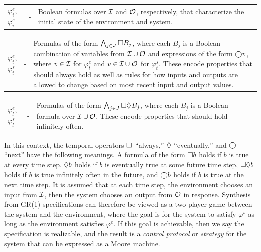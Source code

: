 \documentclass[runningheads]{llncs}
\begin{document}
\vspace{0.5em}

\noindent \begin{xtabular}{p{.045\columnwidth}p{.015\columnwidth}p{.860\columnwidth}}
 $\varphi^e_i$, $\varphi^s_i$ & - & Boolean formulas over $\mathcal{I}$ and $\mathcal{O}$, respectively, that characterize the initial state of the environment and system.
\end{xtabular}

\vspace{0.5em}

\noindent \begin{xtabular}{p{.045\columnwidth}p{.015\columnwidth}p{.860\columnwidth}}
 $\varphi^e_t$, $\varphi^s_t$ & - &  Formulas of the form $\bigwedge_{j \in J} \square B_j$, where each $B_j$ is a Boolean combination of variables from $\mathcal{I} \cup \mathcal{O}$ and expressions of the form $\varbigcirc v$, where $v \in \mathcal{I}$ for $\varphi^e_t$ and $v \in \mathcal{I} \cup \mathcal{O}$ for $\varphi^s_t$. These encode properties that should always hold as well as rules for how inputs and outputs are allowed to change based on most recent input and output values.
\end{xtabular}

\vspace{0.5em}

\noindent \begin{xtabular}{p{.045\columnwidth}p{.015\columnwidth}p{.860\columnwidth}}
$\varphi^e_l$, $\varphi^s_l$ & - & Formulas of the form $\bigwedge_{j \in J} \square \lozenge B_j$, where each $B_j$ is a Boolean formula over $\mathcal{I} \cup \mathcal{O}$. These encode properties that should hold infinitely often.
\end{xtabular}

\vspace{0.5em}

\noindent 
In this context, the temporal operators $\square$ ``always,'' $\lozenge$ ``eventually,'' and $\varbigcirc$  ``next'' have the following meanings. 
A formula of the form $\square b$ holds if $b$ is true at every time step, 
$\lozenge b$ holds if $b$ is eventually true at some future time step, 
$\square \lozenge b$ holds if $b$ is true infinitely often in the future, 
and $\varbigcirc b$ holds if $b$ is true at the next time step. 
It is assumed that at each time step, the environment chooses an input from $\mathcal{I}$, then the system chooses an output from $\mathcal{O}$ in response. 
Synthesis from GR(1) specifications can therefore be viewed as a two-player game between the system and the environment, 
where the goal is for the system to satisfy $\varphi^s$ as long as the environment satisfies $\varphi^e$. 
If this goal is achievable, then we say the specification is realizable, 
and the result is a \emph{control protocol} or \emph{strategy} for the system that can be expressed as a Moore machine. 
\end{document}
